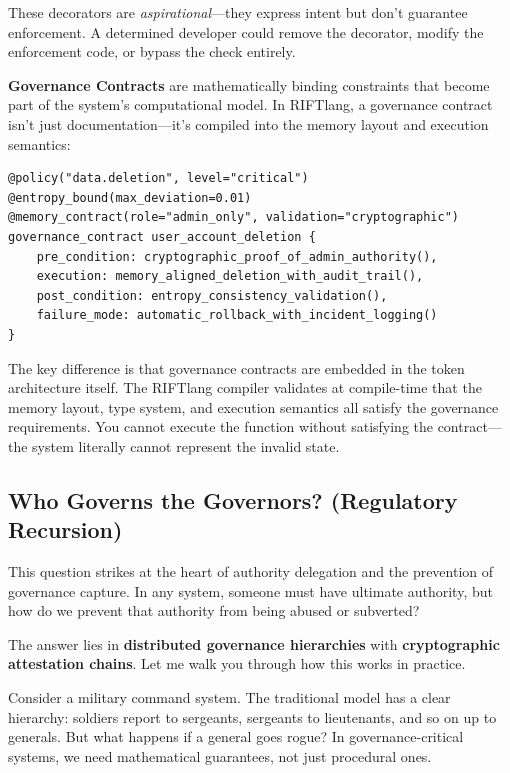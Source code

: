 These decorators are \textit{aspirational}—they express intent but don't guarantee enforcement. A determined developer could remove the decorator, modify the enforcement code, or bypass the check entirely.

\textbf{Governance Contracts} are mathematically binding constraints that become part of the system's computational model. In RIFTlang, a governance contract isn't just documentation—it's compiled into the memory layout and execution semantics:

\begin{lstlisting}[language=rift]
@policy("data.deletion", level="critical")
@entropy_bound(max_deviation=0.01)
@memory_contract(role="admin_only", validation="cryptographic")
governance_contract user_account_deletion {
    pre_condition: cryptographic_proof_of_admin_authority(),
    execution: memory_aligned_deletion_with_audit_trail(),
    post_condition: entropy_consistency_validation(),
    failure_mode: automatic_rollback_with_incident_logging()
}
\end{lstlisting}

The key difference is that governance contracts are embedded in the token architecture itself. The RIFTlang compiler validates at compile-time that the memory layout, type system, and execution semantics all satisfy the governance requirements. You cannot execute the function without satisfying the contract—the system literally cannot represent the invalid state.

\subsection{Who Governs the Governors? (Regulatory Recursion)}

This question strikes at the heart of authority delegation and the prevention of governance capture. In any system, someone must have ultimate authority, but how do we prevent that authority from being abused or subverted?

The answer lies in \textbf{distributed governance hierarchies} with \textbf{cryptographic attestation chains}. Let me walk you through how this works in practice.

Consider a military command system. The traditional model has a clear hierarchy: soldiers report to sergeants, sergeants to lieutenants, and so on up to generals. But what happens if a general goes rogue? In governance-critical systems, we need mathematical guarantees, not just procedural ones.

